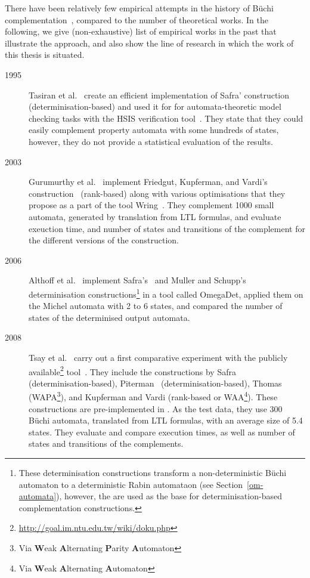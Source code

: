 There have been relatively few empirical attempts in the history of Büchi complementation~\cite{2011_tsai}, compared to the number of theoretical works. In the following, we give  (non-exhaustive) list of empirical works in the past that illustrate the approach, and also show the line of research in which the work of this thesis is situated.

{
\begin{description}
\item[1995] Tasiran et al.~\cite{1995_tasiran} create an efficient implementation of Safra' construction\cite{1988_safra_2} (determinisation-based) and used it for for automata-theoretic model checking tasks with the HSIS verification tool~\cite{1994_hsis}. They state that they could easily complement property automata with some hundreds of states, however, they do not provide a statistical evaluation of the results.

\item[2003] Gurumurthy et al.~\cite{2003_Gurumurthy} implement Friedgut, Kupferman, and Vardi's construction~\cite{Kupferman:2001} (rank-based) along with various optimisations that they propose as a part of the tool Wring~\cite{somenzi2000efficient}. They complement 1000 small automata, generated by translation from LTL formulas, and evaluate exeuction time, and number of states and transitions of the complement for the different versions of the construction.

\item[2006] Althoff et al.~\cite{2006_althoff} implement Safra's~\cite{1988_safra_2} and Muller and Schupp's~\cite{Muller199569} determinisation constructions\footnote{These determinisation constructions transform a non-deterministic Büchi automaton to a deterministic Rabin automataon (see Section~\ref{om-automata}), however, the are used as the base for determinisation-based complementation constructions.} in a tool called OmegaDet, applied them on the Michel automata with 2 to 6 states, and compared the number of states of the determinised output automata.

\item[2008] Tsay et al.~\cite{2008_goal_ext} carry out a first comparative experiment with the publicly available\footnote{\url{http://goal.im.ntu.edu.tw/wiki/doku.php}} \goal{} tool~\cite{2007_goal}\cite{2008_goal_ext}\cite{2009_goal}\cite{2013_goal}. They include the constructions by Safra~\cite{1988_safra_2} (determinisation-based), Piterman~\cite{2007_piterman} (determinisation-based), Thomas~\cite{1999_thomas} (WAPA\footnote{Via \textbf{W}eak \textbf{A}lternating \textbf{P}arity \textbf{A}utomaton}), and Kupferman and Vardi\cite{Kupferman:2001} (rank-based or WAA\footnote{Via \textbf{W}eak \textbf{A}lternating \textbf{A}utomaton}). These constructions are pre-implemented in \goal. As the test data, they use 300 Büchi automata, translated from LTL formulas, with an average size of 5.4 states. They evaluate and compare execution times, as well as number of states and transitions of the complements.


\end{description}}
